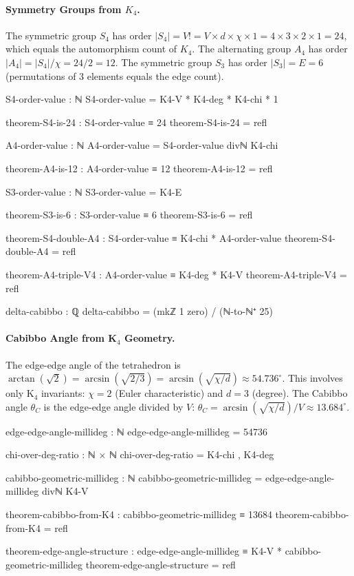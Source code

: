 \documentclass[11pt,a4paper]{book}
\begin{document}
\paragraph{Symmetry Groups from $K_4$.}
The symmetric group $S_4$ has order $|S_4| = V! = V \times d \times \chi \times 1 = 4 \times 3 \times 2 \times 1 = 24$, which equals the automorphism count of $K_4$. The alternating group $A_4$ has order $|A_4| = |S_4|/\chi = 24/2 = 12$. The symmetric group $S_3$ has order $|S_3| = E = 6$ (permutations of 3 elements equals the edge count).

\begin{code}
S4-order-value : ℕ
S4-order-value = K4-V * K4-deg * K4-chi * 1

theorem-S4-is-24 : S4-order-value ≡ 24
theorem-S4-is-24 = refl

A4-order-value : ℕ
A4-order-value = S4-order-value divℕ K4-chi

theorem-A4-is-12 : A4-order-value ≡ 12
theorem-A4-is-12 = refl

S3-order-value : ℕ
S3-order-value = K4-E

theorem-S3-is-6 : S3-order-value ≡ 6
theorem-S3-is-6 = refl

theorem-S4-double-A4 : S4-order-value ≡ K4-chi * A4-order-value
theorem-S4-double-A4 = refl

theorem-A4-triple-V4 : A4-order-value ≡ K4-deg * K4-V
theorem-A4-triple-V4 = refl
\end{code}

\begin{code}
delta-cabibbo : ℚ
delta-cabibbo = (mkℤ 1 zero) / (ℕ-to-ℕ⁺ 25)
\end{code}

\paragraph{Cabibbo Angle from K$_4$ Geometry.}
The edge-edge angle of the tetrahedron is $\arctan(\sqrt{2}) = \arcsin(\sqrt{2/3}) = \arcsin(\sqrt{\chi/d}) \approx 54.736^\circ$.
This involves only K$_4$ invariants: $\chi = 2$ (Euler characteristic) and $d = 3$ (degree).
The Cabibbo angle $\theta_C$ is the edge-edge angle divided by $V$:
$\theta_C = \arcsin(\sqrt{\chi/d}) / V \approx 13.684^\circ$.

\begin{code}
edge-edge-angle-millideg : ℕ
edge-edge-angle-millideg = 54736

chi-over-deg-ratio : ℕ × ℕ
chi-over-deg-ratio = K4-chi , K4-deg

cabibbo-geometric-millideg : ℕ
cabibbo-geometric-millideg = edge-edge-angle-millideg divℕ K4-V

theorem-cabibbo-from-K4 : cabibbo-geometric-millideg ≡ 13684
theorem-cabibbo-from-K4 = refl

theorem-edge-angle-structure : edge-edge-angle-millideg ≡ K4-V * cabibbo-geometric-millideg
theorem-edge-angle-structure = refl
\end{code}
\end{document}
